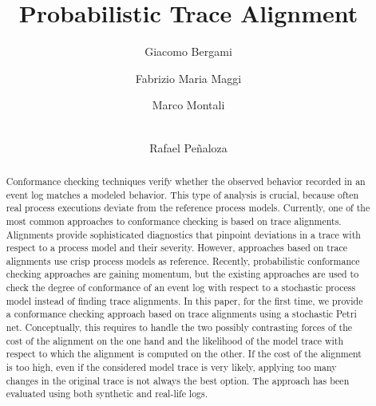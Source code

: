 \documentclass[runningheads,final]{llncs}
\begin{document}
%
\title{Probabilistic Trace Alignment}
%
%
\author{
	Giacomo Bergami \and
	Fabrizio Maria Maggi \and
	Marco Montali \and \\
	Rafael Pe\~naloza}

%

%
%
\maketitle              %

\begin{abstract}
Conformance checking techniques verify whether the observed behavior recorded in an event log matches a modeled behavior. 
This type of analysis is crucial, because often real process executions deviate from the reference process models. Currently, 
one of the most common approaches to conformance checking is based on trace alignments. Alignments provide sophisticated 
diagnostics that pinpoint deviations in a trace with respect to a process model and their severity. However, approaches based on 
trace alignments use crisp process models as reference. Recently, probabilistic conformance checking approaches are gaining 
momentum, but the existing approaches are used to check the degree of conformance of an event log with respect to a stochastic 
process model instead of finding trace alignments.
In this paper, for the first time, we provide a conformance checking approach based on trace alignments using a stochastic Petri net. 
Conceptually, this requires to handle the two possibly contrasting forces of the cost of the alignment on the one hand and the 
likelihood of the model trace with respect to which the alignment is computed on the other. If the cost of the alignment is too high, 
even if the considered model trace is very likely, applying too many changes in the original trace is not always the best option. The 
approach has been evaluated using both synthetic and real-life logs.
\end{abstract}
\end{document}
